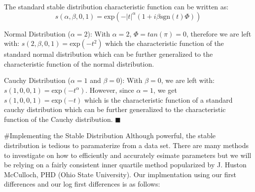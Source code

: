 \documentclass[]{article}
\begin{document}
The standard stable distribution characteristic function can be written
as:
\[s(\alpha, \beta, 0, 1) = \text{exp}(-|t|^{\alpha}(1+i\beta \text{sgn}(t)\Phi))\]

Normal Distribution (\(\alpha = 2\)): With \(\alpha = 2\),
\(\Phi = tan(\pi) = 0\), therefore we are left with:
\(s(2, \beta, 0, 1) = \text{exp}(-t^{2})\) which the characteristic
function of the standard normal distribution which can be further
generalized to the characteristic function of the normal distribution.

Cauchy Distribution (\(\alpha = 1\) and \(\beta = 0\)): With
\(\beta = 0\), we are left with:
\(s(1, 0, 0, 1) = \text{exp}(-t^{\alpha})\). However, since
\(\alpha = 1\), we get \(s(1, 0, 0, 1) = \text{exp}(-t)\) which is the
characteristic function of a standard cauchy distribution which can be
further generalized to the characteristic function of the Cauchy
distribution. \(\blacksquare\)

\#Implementing the Stable Distribution Although powerful, the stable
distribution is tedious to paramaterize from a data set. There are many
methods to investigate on how to efficiently and accurately esimate
parameters but we will be relying on a fairly consistent inner quartile
method popularized by J. Huston McCulloch, PHD (Ohio State University).
Our implmentation using our first differences and our log first
differences is as follows:
\end{document}
